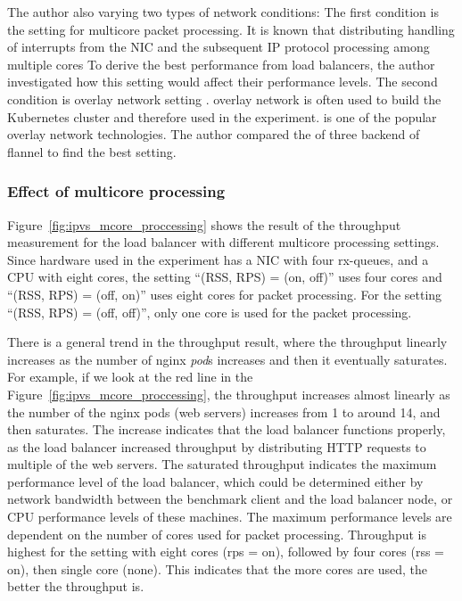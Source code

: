 The author also  varying two types of network conditions:
The first condition is the setting for multicore packet processing.
It is known that distributing handling of interrupts from the NIC and the subsequent IP protocol processing\deleted[id=2nd]{,} among multiple cores 
To derive the best performance from load balancers, the author investigated how this setting would affect their performance levels.
The second condition is  overlay network setting \cite{Sill2016,Marmol2015}.
 overlay network is often used to build the Kubernetes cluster and therefore used in the experiment.
 \cite{CoreOSFlannel} is one of the popular overlay network technologies. 
The author compared the  of three backend  \cite{CoreOSFlannelBackend} of flannel to find the best setting.

\FloatBarrier

\subsubsection{Effect of multicore processing}

Figure~\ref{fig:ipvs_mcore_proccessing} shows the result of the throughput measurement for the  load balancer with different multicore processing settings.
Since hardware used in the experiment has a NIC with four rx-queues, and a CPU with eight cores,
the setting \enquote{(RSS, RPS) = (on, off)} uses four cores and \enquote{(RSS, RPS) = (off, on)} uses eight cores for packet processing.
For the setting \enquote{(RSS, RPS) = (off, off)}, only one core is used for the packet processing.

There is a general trend in the throughput result, where the throughput linearly increases as the number of nginx {\em pod}s increases and then it eventually saturates.
For example, if we look at the red line in the Figure~\ref{fig:ipvs_mcore_proccessing}, the throughput increases almost linearly as the number of the nginx pods (web servers) increases from 1 to around 14, and then saturates.
The increase indicates that the load balancer functions properly, as the load balancer increased throughput by distributing HTTP requests to multiple of the web servers.
%
The saturated throughput indicates the maximum performance level of the load balancer, which could be determined either by network bandwidth between the benchmark client and the load balancer node, or CPU performance levels of these machines.
%
The maximum performance levels are dependent on the number of cores used for packet processing.
Throughput is highest for the setting with eight cores (rps = on), followed by four cores (rss = on), then single core (none).
This indicates that the more cores are used, the better the throughput is.

